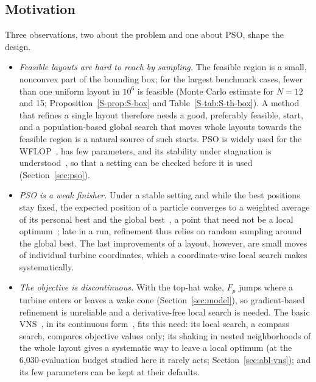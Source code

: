 \subsection{Motivation}
\label{sec:psovns-motivation}
Three observations, two about the problem and one about PSO, shape the design.
\begin{itemize}
\item \emph{Feasible layouts are hard to reach by sampling.} The feasible region is a small, nonconvex part of the bounding box; for the largest benchmark cases, fewer than one uniform layout in $10^6$ is feasible (Monte Carlo estimate for $N=12$ and 15; Proposition~\ref{S-prop:S-box} and Table~\ref{S-tab:S-th-box}). A method that refines a single layout therefore needs a good, preferably feasible, start, and a population-based global search that moves whole layouts towards the feasible region is a natural source of such starts. PSO is widely used for the WFLOP~\cite{Pookpunt2013,Asaah2021}, has few parameters, and its stability under stagnation is understood~\cite{Poli2009,Bonyadi2017,Cleghorn2018}, so that a setting can be checked before it is used (Section~\ref{sec:pso}).
\item \emph{PSO is a weak finisher.} Under a stable setting and while the best positions stay fixed, the expected position of a particle converges to a weighted average of its personal best and the global best~\cite{Trelea2003,VandenBergh2006}, a point that need not be a local optimum~\cite{Bonyadi2017}; late in a run, refinement thus relies on random sampling around the global best. The last improvements of a layout, however, are small moves of individual turbine coordinates, which a coordinate-wise local search makes systematically.
\item \emph{The objective is discontinuous.} With the top-hat wake, $F_p$ jumps where a turbine enters or leaves a wake cone (Section~\ref{sec:model}), so gradient-based refinement is unreliable and a derivative-free local search is needed. The basic VNS~\cite{Mladenovic1997,Hansen2001}, in its continuous form~\cite{Mladenovic2008}, fits this need: its local search, a compass search, compares objective values only; its shaking in nested neighborhoods of the whole layout gives a systematic way to leave a local optimum (at the 6,030-evaluation budget studied here it rarely acts; Section~\ref{sec:abl-vns}); and its few parameters can be kept at their defaults.
\end{itemize}

